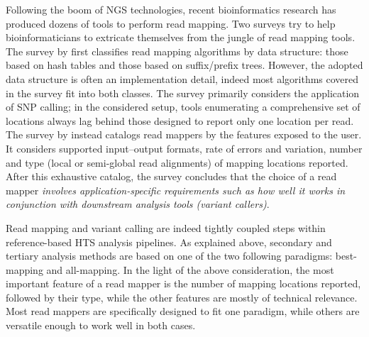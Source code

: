 Following the boom of NGS technologies, recent bioinformatics research has produced dozens of tools to perform read mapping.
Two surveys \citep{Li2010, Fonseca2012} try to help bioinformaticians to extricate themselves from the jungle of read mapping tools.
The survey by \citeauthor{Li2010} first classifies read mapping algorithms by data structure: those based on hash tables and those based on suffix/prefix trees.
However, the adopted data structure is often an implementation detail, indeed most algorithms covered in the survey fit into both classes.
The survey primarily considers the application of SNP calling; in the considered setup, tools enumerating a comprehensive set of locations always lag behind those designed to report only one location per read.
The survey by \citeauthor{Fonseca2012} instead catalogs read mappers by the features exposed to the user.
It considers supported input--output formats, rate of errors and variation, number and type (\ie local or semi-global read alignments) of mapping locations reported.
After this exhaustive catalog, the survey concludes that the choice of a read mapper 
\emph{involves application-specific requirements such as how well it works in conjunction with downstream analysis tools (\ie variant callers)}.

Read mapping and variant calling are indeed tightly coupled steps within reference-based HTS analysis pipelines.
As explained above, secondary and tertiary analysis methods are based on one of the two following paradigms: best-mapping and all-mapping.
In the light of the above consideration, the most important feature of a read mapper is the number of mapping locations reported, followed by their type, while the other features are mostly of technical relevance.
Most read mappers are specifically designed to fit one paradigm, while others are versatile enough to work well in both cases.

